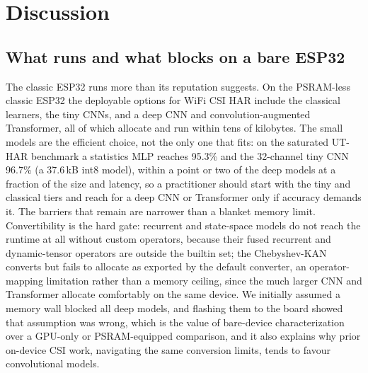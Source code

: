 \documentclass{ieeeaccess}
\begin{document}
\section{Discussion}
\label{sec:discussion}

\subsection{What runs and what blocks on a bare ESP32}
The classic ESP32 runs more than its reputation suggests. On the PSRAM-less classic ESP32 the deployable options for WiFi CSI HAR include the classical learners, the tiny CNNs, and a deep CNN and convolution-augmented Transformer, all of which allocate and run within tens of kilobytes. The small models are the efficient choice, not the only one that fits: on the saturated UT-HAR benchmark a statistics MLP reaches 95.3\% and the 32-channel tiny CNN 96.7\% (a 37.6\,kB int8 model), within a point or two of the deep models at a fraction of the size and latency, so a practitioner should start with the tiny and classical tiers and reach for a deep CNN or Transformer only if accuracy demands it. The barriers that remain are narrower than a blanket memory limit. Convertibility is the hard gate: recurrent and state-space models do not reach the runtime at all without custom operators, because their fused recurrent and dynamic-tensor operators are outside the builtin set; the Chebyshev-KAN converts but fails to allocate as exported by the default converter, an operator-mapping limitation rather than a memory ceiling, since the much larger CNN and Transformer allocate comfortably on the same device. We initially assumed a memory wall blocked all deep models, and flashing them to the board showed that assumption was wrong, which is the value of bare-device characterization over a GPU-only or PSRAM-equipped comparison, and it also explains why prior on-device CSI work, navigating the same conversion limits, tends to favour convolutional models.
\end{document}
